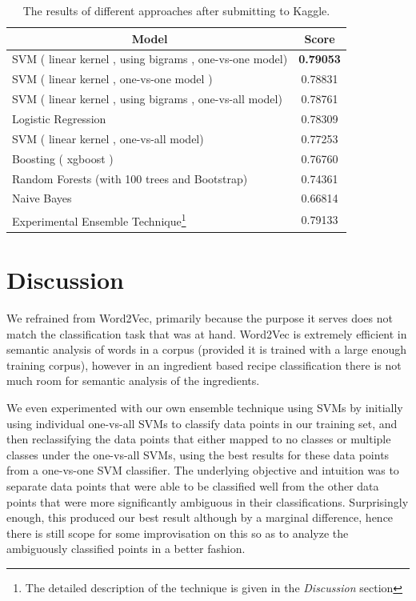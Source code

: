 \documentclass[prodmode,acmtap]{acmlarge}
\newcommand*{\myalign}[2]{\multicolumn{1}{#1}{#2}}
\begin{document}
\begin {table}
	\centering
	\begin{tabular}{|l|c|}
		\hline
		\myalign{|c|}{Model} & \myalign{|c|}{Score} \\ 
		\hline
		SVM ( linear kernel , using bigrams , one-vs-one model) & \textbf{0.79053} \\
		\hline
		SVM ( linear kernel , one-vs-one model ) & 0.78831 \\
		\hline
		SVM ( linear kernel , using bigrams , one-vs-all model) & 0.78761 \\
		\hline
		Logistic Regression & 0.78309 \\
		\hline
		SVM ( linear kernel , one-vs-all model) & 0.77253 \\
		\hline
		Boosting ( xgboost ) & 0.76760 \\
		\hline
		Random Forests (with 100 trees and Bootstrap) & 0.74361\\
		\hline
		Naive Bayes & 0.66814 \\
		\hline
		Experimental Ensemble Technique\footnote{The detailed description of the technique is given in the \textit{Discussion} section} & 0.79133 \\
		\hline		

	\end{tabular}

\caption{ The results of different approaches after submitting to Kaggle.}
\label{resultstable}
\end {table}

\section{Discussion}
We refrained from Word2Vec, primarily because the purpose it serves does not match the classification task that was at hand. Word2Vec is extremely efficient in semantic analysis of words in a corpus (provided it is trained with a large enough training corpus), however in an ingredient based recipe classification there is not much room for semantic analysis of the ingredients.

We even experimented with our own ensemble technique using SVM\textquotesingle s by initially using individual one-vs-all SVM\textquotesingle s to classify data points in our training set, and then reclassifying the data points that either mapped to no classes or multiple classes under the one-vs-all SVM\textquotesingle s, using the best results for these data points from a one-vs-one SVM classifier. The underlying objective and intuition was to separate data points that were able to be classified well from the other data points that were more significantly ambiguous in their classifications. Surprisingly enough, this produced our best result although by a marginal difference, hence there is still scope for some improvisation on this so as to analyze the ambiguously classified points in a better fashion.
\end{document}
